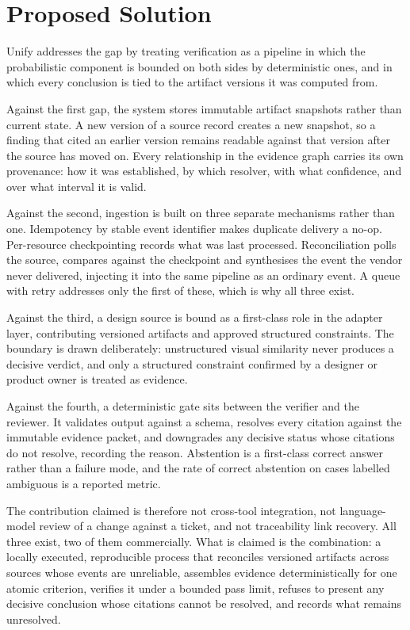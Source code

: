 \section{Proposed Solution}

Unify addresses the gap by treating verification as a pipeline in which the
probabilistic component is bounded on both sides by deterministic ones, and in
which every conclusion is tied to the artifact versions it was computed from.

Against the first gap, the system stores immutable artifact snapshots rather
than current state. A new version of a source record creates a new snapshot, so
a finding that cited an earlier version remains readable against that version
after the source has moved on. Every relationship in the evidence graph carries
its own provenance: how it was established, by which resolver, with what
confidence, and over what interval it is valid.

Against the second, ingestion is built on three separate mechanisms rather than
one. Idempotency by stable event identifier makes duplicate delivery a no-op.
Per-resource checkpointing records what was last processed. Reconciliation polls
the source, compares against the checkpoint and synthesises the event the vendor
never delivered, injecting it into the same pipeline as an ordinary event. A
queue with retry addresses only the first of these, which is why all three
exist.

Against the third, a design source is bound as a first-class role in the adapter
layer, contributing versioned artifacts and approved structured constraints. The
boundary is drawn deliberately: unstructured visual similarity never produces a
decisive verdict, and only a structured constraint confirmed by a designer or
product owner is treated as evidence.

Against the fourth, a deterministic gate sits between the verifier and the
reviewer. It validates output against a schema, resolves every citation against
the immutable evidence packet, and downgrades any decisive status whose
citations do not resolve, recording the reason. Abstention is a first-class
correct answer rather than a failure mode, and the rate of correct abstention on
cases labelled ambiguous is a reported metric.

The contribution claimed is therefore not cross-tool integration, not
language-model review of a change against a ticket, and not traceability link
recovery. All three exist, two of them commercially. What is claimed is the
combination: a locally executed, reproducible process that reconciles versioned
artifacts across sources whose events are unreliable, assembles evidence
deterministically for one atomic criterion, verifies it under a bounded pass
limit, refuses to present any decisive conclusion whose citations cannot be
resolved, and records what remains unresolved.

